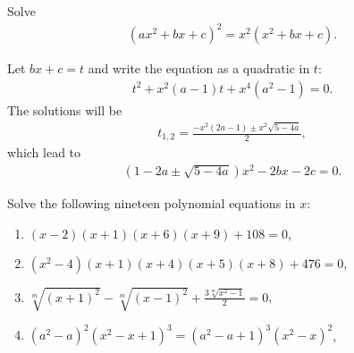 \documentclass[12pt,a4paper]{memoir}
\theoremstyle{definition}
\begin{document}
\begin{tcolorbox}
	\begin{question}
		Solve
		\begin{align*}
			(ax^2+bx+c)^2 = x^2(x^2+bx+c).
		\end{align*}
	\end{question}
\end{tcolorbox}

\begin{solution}[name=Solution by Parviz Shahriari]
	Let $bx+c= t$ and write the equation as a quadratic in $t$:
	\begin{align*}
		t^2+x^2(a-1)t+x^4(a^2-1)=0.
	\end{align*}
	The solutions will be
	\begin{align*}
		t_{1,2} = \frac{-x^2(2a-1)\pm x^2\sqrt{5-4a}}{2},
	\end{align*}
	which lead to
	\begin{align*}
		(1 - 2a \pm \sqrt{5-4a})x^2-2bx-2c=0.
	\end{align*}
\end{solution}

\begin{question}
	Solve the following nineteen polynomial equations in $x$:
	\begin{enumerate}
		\item $(x-2)(x+1)(x+6)(x+9)+108 = 0$,
		\item $(x^2-4)(x+1)(x+4)(x+5)(x+8)+476=0$,
		\item $\sqrt[m]{(x+1)^2} - \sqrt[m]{(x-1)^2} + \displaystyle \frac{3\sqrt[m]{x^2-1}}{2}=0$,
		\item $(a^2-a)^2(x^2-x+1)^3 = (a^2-a+1)^3(x^2-x)^2$,
	\end{enumerate}
\end{question}
\end{document}
